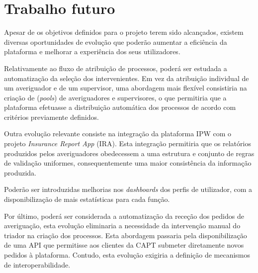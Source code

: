 \section{Trabalho futuro} \label{sec:trabalho-futuro}

Apesar de os objetivos definidos para o projeto terem sido alcançados, existem diversas oportunidades de evolução que poderão aumentar a eficiência da plataforma e melhorar a experiência dos seus utilizadores.

Relativamente ao fluxo de atribuição de processos, poderá ser estudada a automatização da seleção dos intervenientes. Em vez da atribuição individual de um averiguador e de um supervisor, uma abordagem mais flexível consistiria na criação de (\textit{pools}) de averiguadores e supervisores, o que permitiria que a plataforma efetuasse a distribuição automática dos processos de acordo com critérios previamente definidos.

Outra evolução relevante consiste na integração da plataforma IPW com o projeto \textit{Insurance Report App} (IRA)\cite{insurance-report-app}. Esta integração permitiria que os relatórios produzidos pelos averiguadores obedecessem a uma estrutura e conjunto de regras de validação uniformes, consequentemente uma maior consistência da informação produzida.

Poderão ser introduzidas melhorias nos \textit{dashboards} dos perfis de utilizador, com a disponibilização de mais estatísticas para cada função.

Por último, poderá ser considerada a automatização da receção dos pedidos de averiguação, esta evolução eliminaria a necessidade da intervenção manual do triador na criação dos processos. Esta abordagem passaria pela disponibilização de uma API que permitisse aos clientes da CAPT submeter diretamente novos pedidos à plataforma. Contudo, esta evolução exigiria a definição de mecanismos de interoperabilidade.
